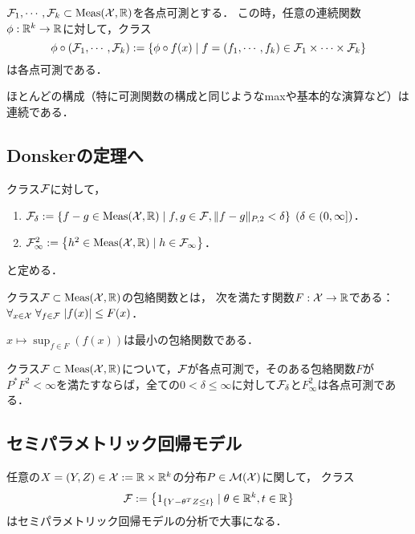 \documentclass[uplatex,dvipdfmx]{jsreport}
\begin{document}
\begin{lemma}[各点可測性の保存]
    $\mathcal{F}_1,\cdots,\mathcal{F}_k\subset\mathrm{Meas}(\mathcal{X},\mathbb{R})$を各点可測とする．
    この時，任意の連続関数$\phi:\mathbb{R}^k\to\mathbb{R}$に対して，クラス
    \[\phi\circ(\mathcal{F}_1,\cdots,\mathcal{F}_k):=\left\{\phi\circ f(x)\mid f=(f_1,\cdots,f_k)\in\mathcal{F}_1\times\cdots\times\mathcal{F}_k\right\}\]
    は各点可測である．
\end{lemma}
\begin{remarks}
    ほとんどの構成（特に可測関数の構成と同じようなmaxや基本的な演算など）は連続である．
\end{remarks}

\subsection{Donskerの定理へ}

\begin{notation}
    クラス$\mathcal{F}$に対して，
    \begin{enumerate}
        \item $\mathcal{F}_\delta:=\left\{f-g\in\mathrm{Meas}(\mathcal{X},\mathbb{R})\mid f,g\in\mathcal{F},\|f-g\|_{P,2}<\delta\right\}\;(\delta\in(0,\infty])$．
        \item $\mathcal{F}^2_\infty:=\left\{h^2\in\mathrm{Meas}(\mathcal{X},\mathbb{R})\mid h\in\mathcal{F}_\infty\right\}$．
    \end{enumerate}
    と定める．
\end{notation}

\begin{definition}\label{def-envelope-function}
    クラス$\mathcal{F}\subset\mathrm{Meas}(\mathcal{X},\mathbb{R})$の包絡関数とは，
    次を満たす関数$F:\mathcal{X}\to\mathbb{R}$である：$\forall_{x\in\mathcal{X}}\;\forall_{f\in\mathcal{F}}\;\lvert f(x)\rvert\le F(x)$．
\end{definition}
\begin{example}
    $x\mapsto\sup_{f\in F}(f(x))$は最小の包絡関数である．
\end{example}

\begin{proposition}\label{prop-pointwise-measurability-of-F2-Finf}
    クラス$\mathcal{F}\subset\mathrm{Meas}(\mathcal{X},\mathbb{R})$について，$\mathcal{F}$が各点可測で，そのある包絡関数$F$が$P^*F^2<\infty$を満たすならば，全ての$0<\delta\le\infty$に対して$\mathcal{F}_\delta$と$F^2_\infty$は各点可測である．
\end{proposition}

\subsection{セミパラメトリック回帰モデル}

\begin{definition}
    任意の$X=(Y,Z)\in\mathcal{X}:=\mathbb{R}\times\mathbb{R}^k$の分布$P\in\mathcal{M}(\mathcal{X})$に関して，
    クラス
    \[\mathcal{F}:=\left\{1_{\left\{Y-\theta^TZ\le t\right\}}\mid\theta\in\mathbb{R}^k,t\in\mathbb{R}\right\}\]
    はセミパラメトリック回帰モデルの分析で大事になる．
\end{definition}
\end{document}
